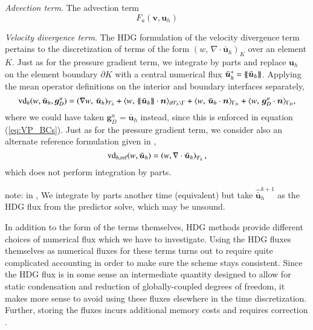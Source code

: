 \textit{Advection term}. The advection term
\begin{equation}
  F_a(\bm{v}, \bm{u}_h)
\end{equation}

\textit{Velocity divergence term}. The HDG formulation of the velocity divergence term pertains to the discretization of terms of the form $\left(w,\, \nabla \cdot \bar{\bm{u}}_h \right)_K$ over an element $K$. Just as for the pressure gradient term, we integrate by parts and replace $\bm{u}_h$ on the element boundary $\partial K$ with a central numerical flux $\bar{\bm{u}}^*_h = \left\{\!\left\{\bar{\bm{u}}_h\right\}\!\right\} $. Applying the mean operator definitions on the interior and boundary interfaces separately,
\begin{equation}
\text{vd}_h(w,\bar{\bm{u}}_h, \bm{g}_D^u)  =  (\nabla w,\, \bar{\bm{u}}_h)_{\mathcal{T}_h}
 + \langle w,\, \left\{\!\left\{\bar{\bm{u}}_h\right\}\!\right\} \cdot\bm{n}\rangle_{\partial\mathcal{T}_h\setminus \Gamma}
 + \langle w,\, \bar{\bm{u}}_h \cdot\bm{n}\rangle_{\Gamma_N}
 + \langle w,\, \bm{g}_D^u \cdot\bm{n}\rangle_{\Gamma_D}
 ,
\end{equation}
where we could have taken $\bm{g}_D^u = \bar{\bm{u}}_h$ instead, since this is enforced in equation (\ref{eq:VP_BCs}). Just as for the pressure gradient term, we consider also an alternate reference formulation given in \cite{hesthaven_nodal_2008}, 
\begin{equation}
  \text{vd}_{h,\text{ref}}(w,\bar{\bm{u}}_h) = \left(w, \nabla \cdot \bar{\bm{u}}_h \right)_{\mathcal{T}_h},
\end{equation}
which does not perform integration by parts. 

note: in \cite{ueckermann_lermusiaux_JCP2016}, We integrate by parts another time (equivalent) but take $\widehat{\bar{\bm{u}}}_h^{k+1}$ as the HDG flux from the predictor solve, which may be unsound.

In addition to the form of the terms themselves, HDG methods provide different choices of numerical flux which we have to investigate. Using the HDG fluxes themselves as numerical fluxes for these terms turns out to require quite complicated accounting in order to make sure the scheme stays consistent. Since the HDG flux is in some sense an intermediate quantity designed to allow for static condensation and reduction of globally-coupled degrees of freedom, it makes more sense to avoid using these fluxes elsewhere in the time discretization. Further, storing the fluxes incurs additional memory costs and requires correction \cite{ueckermann_lermusiaux_JCP2016}.

